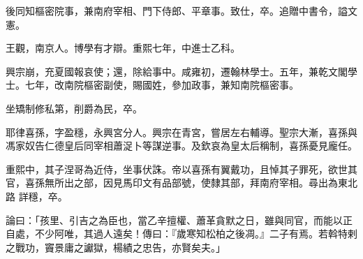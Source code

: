 \begin{pinyinscope}
 後同知樞密院事，兼南府宰相、門下侍郎、平章事。致仕，卒。追贈中書令，謚文憲。



 王觀，南京人。博學有才辯。重熙七年，中進士乙科。



 興宗崩，充夏國報哀使；還，除給事中。咸雍初，遷翰林學士。五年，兼乾文閣學士。七年，改南院樞密副使，賜國姓，參加政事，兼知南院樞密事。



 坐矯制修私第，削爵為民，卒。



 耶律喜孫，字盈穩，永興宮分人。興宗在青宮，嘗居左右輔導。聖宗大漸，喜孫與馮家奴告仁德皇后同宰相蕭浞卜等謀逆事。及欽哀為皇太后稱制，喜孫憂見龐任。



 重熙中，其子涅哥為近侍，坐事伏誅。帝以喜孫有翼戴功，且悼其子罪死，欲世其官，喜孫無所出之部，因見馬印文有品部號，使隸其部，拜南府宰相。尋出為東北路
 詳穩，卒。



 論曰：「孩里、引吉之為臣也，當乙辛擅權、蕭革貪默之日，雖與同官，而能以正自處，不少阿唯，其過人遠矣！傳曰：『歲寒知松柏之後凋。』二子有焉。若斡特剌之戰功，竇景庸之讞獄，楊績之忠告，亦賢矣夫。」



\end{pinyinscope}